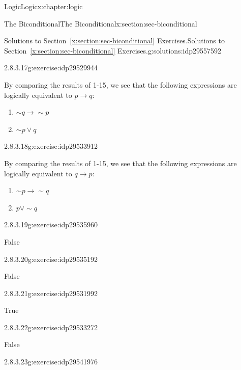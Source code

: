 \documentclass[twoside,10pt,]{book}
\newcommand{\xreffont}{\relax}
\numberwithin{equation}{section}
\newcommand{\conditional}{{p {\rightarrow} q}}
\newcommand{\inverse}{{\sim\!{p}{} {\rightarrow} \sim\!{q}{}}}
\newcommand{\converse}{{q {\rightarrow} p}}
\newcommand{\contrapositive}{{\sim\!{q}{} {\rightarrow} \sim\!{p}{}}}
\begin{document}
\begin{chapterptx}{Logic}{}{Logic}{}{}{x:chapter:logic}
\begin{sectionptx}{The Biconditional}{}{The Biconditional}{}{}{x:section:sec-biconditional}
\begin{solutions-subsection}{Solutions to Section~{\xreffont\ref*{x:section:sec-biconditional}} Exercises.}{}{Solutions to Section~{\xreffont\ref*{x:section:sec-biconditional}} Exercises.}{}{}{g:solutions:idp29557592}
\begin{divisionsolution}{2.8.3.17}{}{g:exercise:idp29529944}
\par\smallskip%
\noindent\hypertarget{g:solution:idp29523800-main}{}By comparing the results of 1-15, we see that the following expressions are logically equivalent to \(\conditional\): %
\begin{enumerate}[label=(\alph*)]
\item{}\(\displaystyle \contrapositive\)%
\item{}\(\displaystyle \sim\!{p}{\vee} q\)%
\end{enumerate}
\end{divisionsolution}%
\begin{divisionsolution}{2.8.3.18}{}{g:exercise:idp29533912}%
\par\smallskip%
\noindent\hypertarget{g:solution:idp29536088-main}{}By comparing the results of 1-15, we see that the following expressions are logically equivalent to \(\converse\): %
\begin{enumerate}[label=(\alph*)]
\item{}\(\displaystyle \inverse\)%
\item{}\(\displaystyle p{\vee}\sim\!{q}\)%
\end{enumerate}
\end{divisionsolution}%
\begin{exercisegroup}
\begin{divisionsolutioneg}{2.8.3.19}{}{g:exercise:idp29535960}%
\par\smallskip%
\noindent\hypertarget{g:solution:idp29535832-main}{}False\end{divisionsolutioneg}%
\begin{divisionsolutioneg}{2.8.3.20}{}{g:exercise:idp29535192}%
\par\smallskip%
\noindent\hypertarget{g:solution:idp29536216-main}{}False\end{divisionsolutioneg}%
\begin{divisionsolutioneg}{2.8.3.21}{}{g:exercise:idp29531992}%
\par\smallskip%
\noindent\hypertarget{g:solution:idp29532120-main}{}True\end{divisionsolutioneg}%
\begin{divisionsolutioneg}{2.8.3.22}{}{g:exercise:idp29533272}%
\par\smallskip%
\noindent\hypertarget{g:solution:idp29533656-main}{}False\end{divisionsolutioneg}%
\begin{divisionsolutioneg}{2.8.3.23}{}{g:exercise:idp29541976}%
\par\smallskip%

\end{divisionsolutioneg}
\end{exercisegroup}
\end{solutions-subsection}
\end{sectionptx}
\end{chapterptx}
\end{document}
